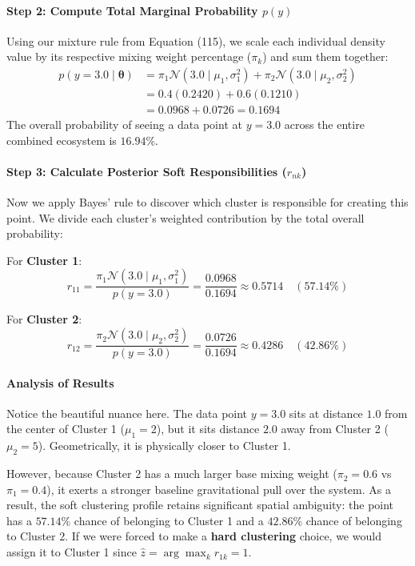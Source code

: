\documentclass{article}
\begin{document}
\paragraph{Step 2: Compute Total Marginal Probability $p(y)$}
Using our mixture rule from Equation (115), we scale each individual density value by its respective mixing weight percentage ($\pi_k$) and sum them together:
\begin{align}
p(y=3.0 \mid \boldsymbol{\theta}) &= \pi_1 \mathcal{N}(3.0 \mid \mu_1, \sigma_1^2) + \pi_2 \mathcal{N}(3.0 \mid \mu_2, \sigma_2^2) \nonumber \\
&= 0.4(0.2420) + 0.6(0.1210) \nonumber \\
&= 0.0968 + 0.0726 = \mathbf{0.1694} \tag{123}
\end{align}
The overall probability of seeing a data point at $y=3.0$ across the entire combined ecosystem is $16.94\%$.

\paragraph{Step 3: Calculate Posterior Soft Responsibilities ($r_{nk}$)}
Now we apply Bayes' rule to discover which cluster is responsible for creating this point. We divide each cluster's weighted contribution by the total overall probability:

For \textbf{Cluster 1}:
\begin{equation}
r_{11} = \frac{\pi_1 \mathcal{N}(3.0 \mid \mu_1, \sigma_1^2)}{p(y=3.0)} = \frac{0.0968}{0.1694} \approx \mathbf{0.5714} \quad (57.14\%) \tag{124}
\end{equation}

For \textbf{Cluster 2}:
\begin{equation}
r_{12} = \frac{\pi_2 \mathcal{N}(3.0 \mid \mu_2, \sigma_2^2)}{p(y=3.0)} = \frac{0.0726}{0.1694} \approx \mathbf{0.4286} \quad (42.86\%) \tag{125}
\end{equation}

\paragraph{Analysis of Results}
Notice the beautiful nuance here. The data point $y=3.0$ sits at distance $1.0$ from the center of Cluster 1 ($\mu_1=2$), but it sits distance $2.0$ away from Cluster 2 ($\mu_2=5$). Geometrically, it is physically closer to Cluster 1. 

However, because Cluster 2 has a much larger base mixing weight ($\pi_2 = 0.6$ vs $\pi_1 = 0.4$), it exerts a stronger baseline gravitational pull over the system. As a result, the soft clustering profile retains significant spatial ambiguity: the point has a $57.14\%$ chance of belonging to Cluster 1 and a $42.86\%$ chance of belonging to Cluster 2. 
If we were forced to make a \textbf{hard clustering} choice, we would assign it to Cluster 1 since $\hat{z} = \arg\max_k r_{1k} = 1$.
\end{document}
